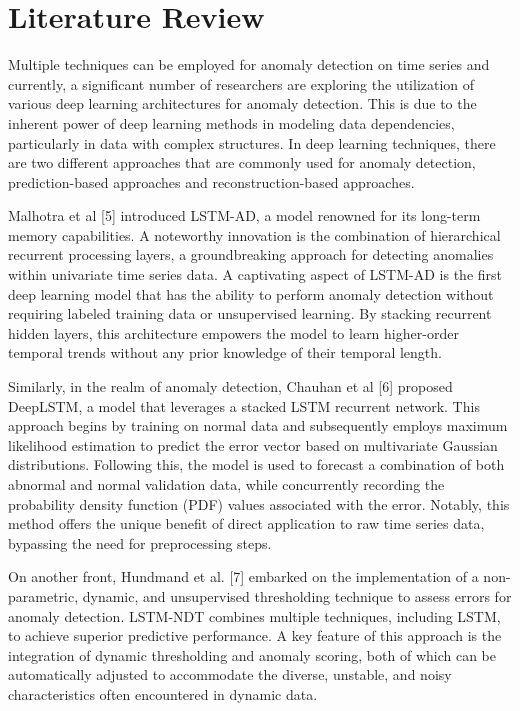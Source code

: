 \documentclass[final,3p,times,twocolumn]{elsarticle}
\begin{document}
\section{Literature Review}\label{sec2}
Multiple techniques can be employed for anomaly detection on time series and currently, a significant number of researchers are exploring the utilization of various deep learning architectures for anomaly detection. This is due to the inherent power of deep learning methods in modeling data dependencies, particularly in data with complex structures. In deep learning techniques, there are two different approaches that are commonly used for anomaly detection, prediction-based approaches and reconstruction-based approaches.

Malhotra et al [5] introduced LSTM-AD, a model renowned for its long-term memory capabilities. A noteworthy innovation is the combination of hierarchical recurrent processing layers, a groundbreaking approach for detecting anomalies within univariate time series data. A captivating aspect of LSTM-AD is the first deep learning model that has the ability to perform anomaly detection without requiring labeled training data or unsupervised learning. By stacking recurrent hidden layers, this architecture empowers the model to learn higher-order temporal trends without any prior knowledge of their temporal length.

Similarly, in the realm of anomaly detection, Chauhan et al [6] proposed DeepLSTM, a model that leverages a stacked LSTM recurrent network. This approach begins by training on normal data and subsequently employs maximum likelihood estimation to predict the error vector based on multivariate Gaussian distributions. Following this, the model is used to forecast a combination of both abnormal and normal validation data, while concurrently recording the probability density function (PDF) values associated with the error. Notably, this method offers the unique benefit of direct application to raw time series data, bypassing the need for preprocessing steps.

On another front, Hundmand et al. [7] embarked on the implementation of a non-parametric, dynamic, and unsupervised thresholding technique to assess errors for anomaly detection. LSTM-NDT combines multiple techniques, including LSTM, to achieve superior predictive performance. A key feature of this approach is the integration of dynamic thresholding and anomaly scoring, both of which can be automatically adjusted to accommodate the diverse, unstable, and noisy characteristics often encountered in dynamic data.
\end{document}
